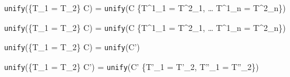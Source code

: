 \documentclass{article}
\begin{document}
    {\texttt{unify}(\{T_1 = T_2\} \cup C) = \texttt{unify}(C \cup \{T^1_1 = T^2_1, \; \dots \; T^1_n = T^2_n\})}

    {\texttt{unify}(\{T_1 = T_2\} \cup C) = \texttt{unify}(C \cup \{T^1_1 = T^2_1, \; \dots \; T^1_n = T^2_n\})}

    {\texttt{unify}(\{T_1 = T_2\} \cup C) = \texttt{unify}(C')}

    {\texttt{unify}(\{T_1 = T_2\} \cup C') = \texttt{unify}(C' \cup \{T'_1 = T'_2, T''_1 = T''_2\})}
\end{document}

